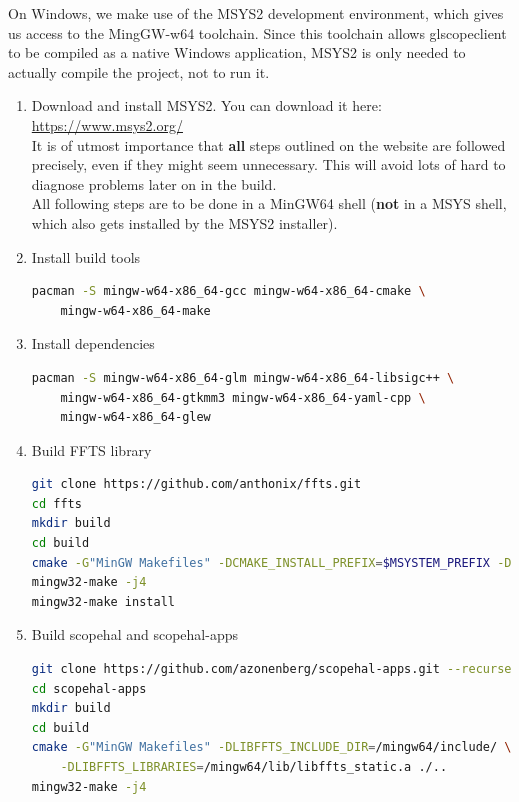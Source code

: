 On Windows, we make use of the MSYS2 development environment, which gives us access to the MingGW-w64 toolchain. Since this toolchain allows glscopeclient to be compiled as a native Windows application, MSYS2 is only needed to actually compile the project, not to run it.

\begin{enumerate}

\item Download and install MSYS2. You can download it here: \url{https://www.msys2.org/}\\
It is of utmost importance that \textbf{all} steps outlined on the website are followed precisely, even if they might seem unnecessary. This will avoid lots of hard to diagnose problems later on in the build.\\

All following steps are to be done in a MinGW64 shell (\textbf{not} in a MSYS shell, which also gets installed by the MSYS2 installer).

\item Install build tools
\begin{lstlisting}[language=sh]
pacman -S mingw-w64-x86_64-gcc mingw-w64-x86_64-cmake \
    mingw-w64-x86_64-make
\end{lstlisting}

\item Install dependencies
\begin{lstlisting}[language=sh]
pacman -S mingw-w64-x86_64-glm mingw-w64-x86_64-libsigc++ \
    mingw-w64-x86_64-gtkmm3 mingw-w64-x86_64-yaml-cpp \
    mingw-w64-x86_64-glew
\end{lstlisting}

\item Build FFTS library
\begin{lstlisting}[language=sh]
git clone https://github.com/anthonix/ffts.git
cd ffts
mkdir build
cd build
cmake -G"MinGW Makefiles" -DCMAKE_INSTALL_PREFIX=$MSYSTEM_PREFIX -DENABLE_SHARED=ON ..
mingw32-make -j4
mingw32-make install
\end{lstlisting}

\item Build scopehal and scopehal-apps
\begin{lstlisting}[language=sh]
git clone https://github.com/azonenberg/scopehal-apps.git --recurse-submodules
cd scopehal-apps
mkdir build
cd build
cmake -G"MinGW Makefiles" -DLIBFFTS_INCLUDE_DIR=/mingw64/include/ \
    -DLIBFFTS_LIBRARIES=/mingw64/lib/libffts_static.a ./..
mingw32-make -j4
\end{lstlisting}


\end{enumerate}
